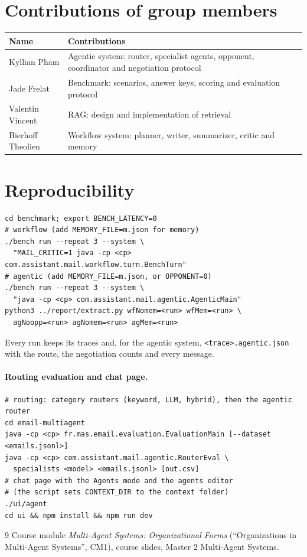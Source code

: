 \documentclass[11pt,a4paper]{article}
\newcommand{\code}[1]{\texttt{#1}}
\begin{document}
\section*{Contributions of group members}
\begin{center}
\begin{tabularx}{\linewidth}{llX}
\toprule
Name & Contributions \\
\midrule
Kyllian Pham & Agentic system: router, specialist agents, opponent, coordinator and negotiation protocol \\
Jade Frelat & Benchmark: scenarios, answer keys, scoring and evaluation protocol \\
Valentin Vincent & RAG: design and implementation of retrieval \\
Bierhoff Theolien & Workflow system: planner, writer, summarizer, critic and memory \\
\bottomrule
\end{tabularx}
\end{center}

\section*{Reproducibility}
\begin{verbatim}
cd benchmark; export BENCH_LATENCY=0
# workflow (add MEMORY_FILE=m.json for memory)
./bench run --repeat 3 --system \
  "MAIL_CRITIC=1 java -cp <cp> com.assistant.mail.workflow.turn.BenchTurn"
# agentic (add MEMORY_FILE=m.json, or OPPONENT=0)
./bench run --repeat 3 --system \
  "java -cp <cp> com.assistant.mail.agentic.AgenticMain"
python3 ../report/extract.py wfNomem=<run> wfMem=<run> \
  agNoopp=<run> agNomem=<run> agMem=<run>
\end{verbatim}
Every run keeps its traces and, for the agentic system, \code{<trace>.agentic.json} with the route, the
negotiation counts and every message.

\paragraph{Routing evaluation and chat page.}
\begin{verbatim}
# routing: category routers (keyword, LLM, hybrid), then the agentic router
cd email-multiagent
java -cp <cp> fr.mas.email.evaluation.EvaluationMain [--dataset <emails.jsonl>]
java -cp <cp> com.assistant.mail.agentic.RouterEval \
  specialists <model> <emails.jsonl> [out.csv]
# chat page with the Agents mode and the agents editor
# (the script sets CONTEXT_DIR to the context folder)
./ui/agent
cd ui && npm install && npm run dev
\end{verbatim}
\begin{thebibliography}{9}
 Course module \emph{Multi-Agent Systems: Organizational Forms} (``Organizations in Multi-Agent Systems'',
  CM1), course slides, Master 2 Multi-Agent Systems.
\end{thebibliography}
\end{document}

